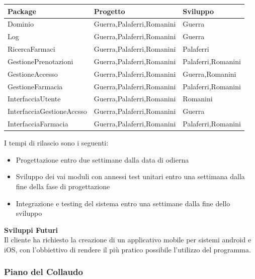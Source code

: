 \begin{tabular} {|P{5cm}|P{5cm}|P{5cm}|} %
    \hline
    \textbf{Package} & \textbf{Progetto} & \textbf{Sviluppo} \\
    \hline
    Dominio  &  Guerra,Palaferri,Romanini  &  Guerra\\
    \hline
    Log  &  Guerra,Palaferri,Romanini & Guerra\\
    \hline
    RicercaFarmaci  &  Guerra,Palaferri,Romanini &  Palaferri \\
    \hline
    GestionePrenotazioni  & Guerra,Palaferri,Romanini & Palaferri,Romanini \\
    \hline
    GestioneAccesso  & Guerra,Palaferri,Romanini & Guerra,Romanini \\
    \hline
    GestioneFarmacia  & Guerra,Palaferri,Romanini & Palaferri,Romanini \\
    \hline
    InterfacciaUtente  & Guerra,Palaferri,Romanini & Romanini \\
    \hline
    InterfacciaGestioneAccsso  & Guerra,Palaferri,Romanini & Guerra\\
    \hline
    InterfacciaFarmacia  & Guerra,Palaferri,Romanini & Palaferri,Romanini \\
    \hline
\end{tabular}
\hfill \break

I tempi di rilascio sono i seguenti:
\begin{itemize}
    \item Progettazione entro due settimane dalla data di odierna
    \item Sviluppo dei vai moduli con annessi test unitari entro una settimana dalla fine della fase di progettazione
    \item Integrazione e testing del sistema entro una settimane dalla fine dello sviluppo
\end{itemize}
\hfill \break

\textbf{Sviluppi Futuri}
\\

Il cliente ha richiesto la creazione di un applicativo mobile per sistemi
android e iOS, con l'obbiettivo di rendere il più pratico possibile l'utilizzo
del programma.

\newpage
\subsubsection{Piano del Collaudo}
